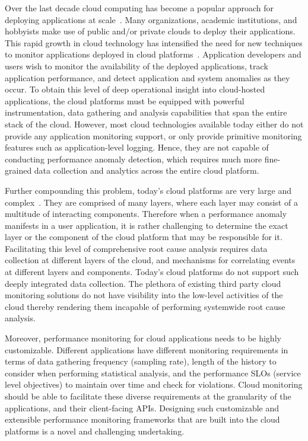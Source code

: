 Over the last decade cloud computing has become a popular approach for deploying
applications at scale~\cite{Antonopoulos:2010:CCP:1855007,Pinheiro:2014:ACC:2618168.2618188}. 
Many organizations, academic institutions, and hobbyists make use of public
and/or private clouds to deploy their applications.
This rapid growth in cloud technology has intensified the need 
for new techniques to
monitor applications deployed in cloud platforms~\cite{DaCunhaRodrigues:2016:MCC:2851613.2851619}. 
Application developers and users wish
to monitor the availability of the deployed applications, track application performance, and detect 
application and system anomalies as they occur. To obtain this level of deep operational insight into
cloud-hosted applications, the cloud platforms must be equipped with powerful instrumentation,
data gathering and analysis capabilities that span the entire stack of the cloud. 
However, most cloud technologies available
today either do not provide any application monitoring support, or only provide primitive
monitoring features such as application-level logging. Hence, they are not capable of conducting
performance anomaly detection, which requires much more fine-grained
data collection and analytics across the entire cloud platform.

Further compounding this problem, today's cloud platforms are very 
large and complex~\cite{DaCunhaRodrigues:2016:MCC:2851613.2851619,Ibidunmoye:2015:PAD:2808687.2791120}. They are
comprised of many layers, where each layer may consist of a multitude of interacting components.
Therefore when a performance anomaly manifests in a user application, it is rather challenging 
to determine the exact layer or the component of the cloud platform that may be responsible for it. 
Facilitating this level of comprehensive root cause analysis requires
data collection at different layers of the cloud, and mechanisms for correlating events at
different layers and components. Today's cloud platforms do not support such deeply integrated
data collection. The plethora of existing third party cloud monitoring solutions
do not have visibility into the low-level activities of the cloud thereby rendering them incapable
of performing systemwide root cause analysis.

Moreover, performance monitoring for cloud applications needs to be highly customizable. Different
applications have different monitoring requirements in terms of data gathering frequency (sampling rate), 
length of the history to consider when performing statistical analysis, and the performance 
SLOs (service level objectives) to maintain over time and check for violations. Cloud monitoring
should be able to facilitate these diverse requirements at the granularity of the applications, and
their client-facing APIs.
Designing such customizable and extensible performance
monitoring frameworks that are built into the cloud platforms is a novel and challenging undertaking.

